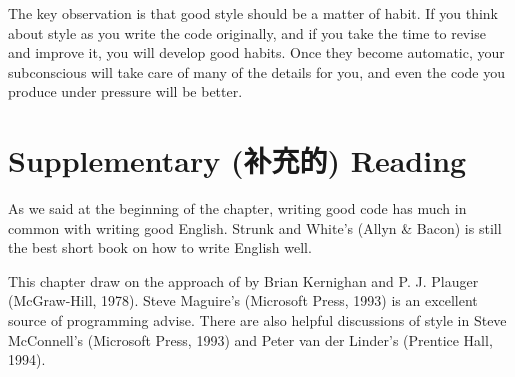 The key observation is that good style should be a matter of habit. If you
think about style as you write the code originally, and if you take the
time to revise and improve it, you will develop good habits. Once they
become automatic, your subconscious will take care of many of the details
for you, and even the code you produce under pressure will be better.

\section*{Supplementary (补充的) Reading}
As we said at the beginning of the chapter, writing good code has much in
common with writing good English. Strunk and White's  (Allyn \& Bacon) is still the best short book on how to write
English well.

This chapter draw on the approach of  by Brian Kernighan and P. J. Plauger (McGraw-Hill, 1978). Steve
Maguire's  (Microsoft Press, 1993) is an
excellent source of programming advise. There are also helpful discussions
of style in Steve McConnell's  (Microsoft Press,
1993) and Peter van der Linder's  (Prentice Hall, 1994).
